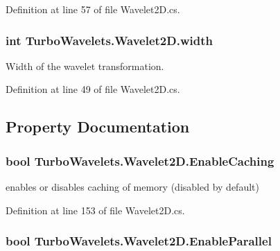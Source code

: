 \-Definition at line 57 of file \-Wavelet2\-D.\-cs.

\hypertarget{class_turbo_wavelets_1_1_wavelet2_d_aaa4b3711957fe1798980e6891331a08d}{
\subsubsection[{width}]{\setlength{\rightskip}{0pt plus 5cm}int {\bf \-Turbo\-Wavelets.\-Wavelet2\-D.\-width}}}\label{class_turbo_wavelets_1_1_wavelet2_d_aaa4b3711957fe1798980e6891331a08d}


\-Width of the wavelet transformation. 



\-Definition at line 49 of file \-Wavelet2\-D.\-cs.



\subsection{\-Property \-Documentation}
\hypertarget{class_turbo_wavelets_1_1_wavelet2_d_abbd41e51d24f8a7912ae47dd364ed4fb}{
\subsubsection[{\-Enable\-Caching}]{\setlength{\rightskip}{0pt plus 5cm}bool {\bf \-Turbo\-Wavelets.\-Wavelet2\-D.\-Enable\-Caching}}}\label{class_turbo_wavelets_1_1_wavelet2_d_abbd41e51d24f8a7912ae47dd364ed4fb}


enables or disables caching of memory (disabled by default) 



\-Definition at line 153 of file \-Wavelet2\-D.\-cs.

\hypertarget{class_turbo_wavelets_1_1_wavelet2_d_abec21e54c6ab8cce0e02ef3ad64ae5af}{
\subsubsection[{\-Enable\-Parallel}]{\setlength{\rightskip}{0pt plus 5cm}bool {\bf \-Turbo\-Wavelets.\-Wavelet2\-D.\-Enable\-Parallel}}}\label{class_turbo_wavelets_1_1_wavelet2_d_abec21e54c6ab8cce0e02ef3ad64ae5af}


